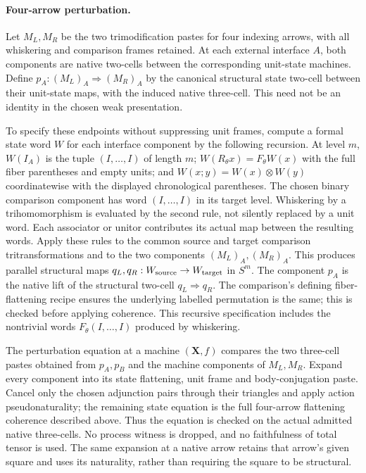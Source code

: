 \documentclass{article}
\begin{document}
\paragraph{Four-arrow perturbation.} Let $M_L,M_R$ be the two trimodification pastes for four indexing arrows, with all whiskering and comparison frames retained. At each external interface $A$, both components are native two-cells between the corresponding unit-state machines. Define $p_A:(M_L)_A\Rightarrow(M_R)_A$ by the canonical structural state two-cell between their unit-state maps, with the induced native three-cell. This need not be an identity in the chosen weak presentation.

To specify these endpoints without suppressing unit frames, compute a formal state word $W$ for each interface component by the following recursion. At level $m$, $W(I_A)$ is the tuple $(I,\ldots,I)$ of length $m$; $W(R_\theta x)=F_\theta W(x)$ with the full fiber parentheses and empty units; and $W(x;y)=W(x)\otimes W(y)$ coordinatewise with the displayed chronological parentheses. The chosen binary comparison component has word $(I,\ldots,I)$ in its target level. Whiskering by a trihomomorphism is evaluated by the second rule, not silently replaced by a unit word. Each associator or unitor contributes its actual map between the resulting words. Apply these rules to the common source and target comparison tritransformations and to the two components $(M_L)_A,(M_R)_A$. This produces parallel structural maps $q_L,q_R:W_{\rm source}\to W_{\rm target}$ in $S^m$. The component $p_A$ is the native lift of the structural two-cell $q_L\Rightarrow q_R$. The comparison's defining fiber-flattening recipe ensures the underlying labelled permutation is the same; this is checked before applying coherence. This recursive specification includes the nontrivial words $F_\theta(I,\ldots,I)$ produced by whiskering.

The perturbation equation at a machine $(\mathbf X,f)$ compares the two three-cell pastes obtained from $p_A,p_B$ and the machine components of $M_L,M_R$. Expand every component into its state flattening, unit frame and body-conjugation paste. Cancel only the chosen adjunction pairs through their triangles and apply action pseudonaturality; the remaining state equation is the full four-arrow flattening coherence described above. Thus the equation is checked on the actual admitted native three-cells. No process witness is dropped, and no faithfulness of total tensor is used. The same expansion at a native arrow retains that arrow's given square and uses its naturality, rather than requiring the square to be structural.
\end{document}
